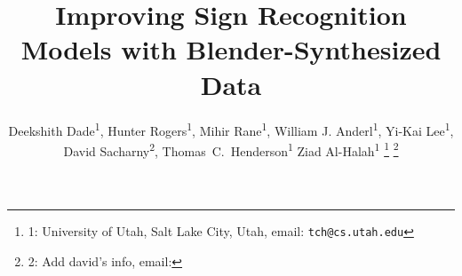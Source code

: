 \documentclass[journal]{IEEEtran}
\begin{document}
%
\title{Improving Sign Recognition Models with Blender-Synthesized Data}
%
%
%

\author{
    Deekshith Dade\textsuperscript{1},
    Hunter Rogers\textsuperscript{1},
    Mihir Rane\textsuperscript{1},
    William J. Anderl\textsuperscript{1},
    Yi-Kai Lee\textsuperscript{1},
    David Sacharny\textsuperscript{2},
    Thomas~C.~Henderson\textsuperscript{1}
    Ziad Al-Halah\textsuperscript{1}
    \thanks{1: University of Utah, Salt Lake City, Utah, email: \tt\small tch@cs.utah.edu}
    \thanks{2: Add david's info, email: }
}



% 
%
\end{document}
